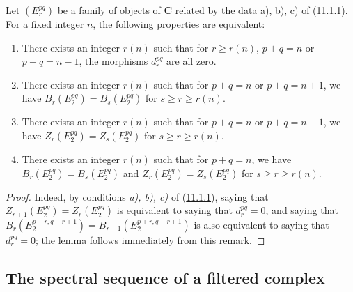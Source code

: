 \begin{lemma}[11.1.10]
\label{0.11.1.10}
Let $(E_r^{pq})$ be a family of objects of $\mathbf{C}$ related by the data
\textup{a), b), c)} of \textup{(\hyperref[0.11.1.1]{11.1.1})}. For a fixed integer $n$, the
following properties are equivalent:
\begin{enumerate}
  \item[\textup{a)}] There exists an integer $r(n)$ such that for $r\geq r(n)$,
    $p+q=n$ or $p+q=n-1$, the morphisms $d_r^{pq}$ are all zero.
  \item[\textup{b)}] There exists an integer $r(n)$ such that for $p+q=n$ or $p+q=n+1$,
    we have $B_r(E_2^{pq})=B_s(E_2^{pq})$ for $s\geq r\geq r(n)$.
  \item[\textup{c)}] There exists an integer $r(n)$ such that for $p+q=n$ or $p+q=n-1$,
    we have $Z_r(E_2^{pq})=Z_s(E_2^{pq})$ for $s\geq r\geq r(n)$.
  \item[\textup{d)}] There exists an integer $r(n)$ such that for $p+q=n$, we have
    $B_r(E_2^{pq})=B_s(E_2^{pq})$ and $Z_r(E_2^{pq})=Z_s(E_2^{pq})$ for
    $s\geq r\geq r(n)$.
\end{enumerate}
\end{lemma}

\begin{proof}
Indeed, by conditions \emph{a), b), c)} of
(\hyperref[0.11.1.1]{11.1.1}), saying that
$Z_{r+1}(E_2^{pq})=Z_r(E_2^{pq})$ is equivalent to saying that $d_r^{pq}=0$, and saying
that
$B_r(E_2^{p+r,q-r+1})=B_{r+1}(E_2^{p+r,q-r+1})$ is also equivalent to saying that
$d_r^{pq}=0$; the lemma follows immediately from this remark.
\end{proof}
\subsection{The spectral sequence of a filtered complex}
\label{subsection:0.11.2}

